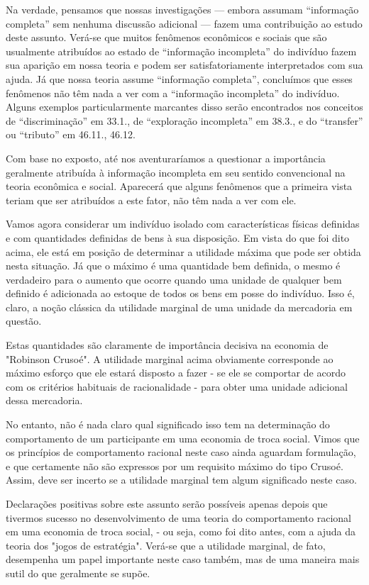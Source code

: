 \documentclass[a4paper,12pt]{article}[abntex2]
\begin{document}
Na verdade, pensamos que nossas investigações --- embora assumam ``informação completa'' sem nenhuma discussão adicional --- fazem uma contribuição ao estudo deste assunto. Verá-se que muitos fenômenos econômicos e sociais que são usualmente atribuídos ao estado de ``informação incompleta'' do indivíduo fazem sua aparição em nossa teoria e podem ser satisfatoriamente interpretados com sua ajuda. Já que nossa teoria assume ``informação completa'', concluímos que esses fenômenos não têm nada a ver com a ``informação incompleta'' do indivíduo. Alguns exemplos particularmente marcantes disso serão encontrados nos conceitos de ``discriminação'' em 33.1., de ``exploração incompleta'' em 38.3., e do ``transfer'' ou ``tributo'' em 46.11., 46.12.

Com base no exposto, até nos aventuraríamos a questionar a importância geralmente atribuída à informação incompleta em seu sentido convencional na teoria econômica e social. Aparecerá que alguns fenômenos que a primeira vista teriam que ser atribuídos a este fator, não têm nada a ver com ele.

Vamos agora considerar um indivíduo isolado com características físicas definidas e com quantidades definidas de bens à sua disposição. Em vista do que foi dito acima, ele está em posição de determinar a utilidade máxima que pode ser obtida nesta situação. Já que o máximo é uma quantidade bem definida, o mesmo é verdadeiro para o aumento que ocorre quando uma unidade de qualquer bem definido é adicionada ao estoque de todos os bens em posse do indivíduo. Isso é, claro, a noção clássica da utilidade marginal de uma unidade da mercadoria em questão.

Estas quantidades são claramente de importância decisiva na economia de "Robinson Crusoé". A utilidade marginal acima obviamente corresponde ao máximo esforço que ele estará disposto a fazer - se ele se comportar de acordo com os critérios habituais de racionalidade - para obter uma unidade adicional dessa mercadoria.

No entanto, não é nada claro qual significado isso tem na determinação do comportamento de um participante em uma economia de troca social. Vimos que os princípios de comportamento racional neste caso ainda aguardam formulação, e que certamente não são expressos por um requisito máximo do tipo Crusoé. Assim, deve ser incerto se a utilidade marginal tem algum significado neste caso.

Declarações positivas sobre este assunto serão possíveis apenas depois que tivermos sucesso no desenvolvimento de uma teoria do comportamento racional em uma economia de troca social, - ou seja, como foi dito antes, com a ajuda da teoria dos "jogos de estratégia". Verá-se que a utilidade marginal, de fato, desempenha um papel importante neste caso também, mas de uma maneira mais sutil do que geralmente se supõe.
\end{document}
